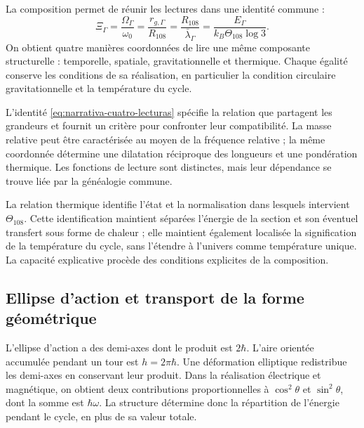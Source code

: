 La composition permet de réunir les lectures dans une identité commune :
\begin{equation}
 \boxed{
 \Xi_\Gamma
 =\frac{\Omega_\Gamma}{\omega_0}
 =\frac{r_{g,\Gamma}}{R_{108}}
 =\frac{R_{108}}{\bar\lambda_\Gamma}
 =\frac{E_\Gamma}{k_B\Theta_{108}\log3}.}
 \label{eq:narrativa-cuatro-lecturas}
\end{equation}
On obtient quatre manières coordonnées de lire une même composante
structurelle : temporelle, spatiale, gravitationnelle et thermique. Chaque égalité
conserve les conditions de sa réalisation, en particulier la condition
circulaire gravitationnelle et la température du cycle.

L’identité \eqref{eq:narrativa-cuatro-lecturas} spécifie la relation
que partagent les grandeurs et fournit un critère pour confronter leur
compatibilité. La masse relative peut être caractérisée au moyen de la fréquence
relative ; la même coordonnée détermine une dilatation réciproque des
longueurs et une pondération thermique. Les fonctions de lecture sont distinctes,
mais leur dépendance se trouve liée par la généalogie commune.

La relation thermique identifie l’état et la normalisation dans lesquels
intervient $\Theta_{108}$. Cette identification maintient séparées l’énergie
de la section et son éventuel transfert sous forme de chaleur ; elle maintient également
localisée la signification de la température du cycle, sans l’étendre à
l’univers comme température unique. La capacité explicative procède des
conditions explicites de la composition.

\subsection{Ellipse d’action et transport de la forme géométrique}
\label{subsec:narrativa-elipse-transporte}

L’ellipse d’action a des demi-axes dont le produit est $2\hbar$. L’aire
orientée accumulée pendant un tour est $h=2\pi\hbar$. Une déformation
elliptique redistribue les demi-axes en conservant leur produit. Dans la
réalisation électrique et magnétique, on obtient deux contributions
proportionnelles à $\cos^2\theta$ et $\sin^2\theta$, dont la somme est
$\hbar\omega$. La structure détermine donc la répartition de
l’énergie pendant le cycle, en plus de sa valeur totale.

